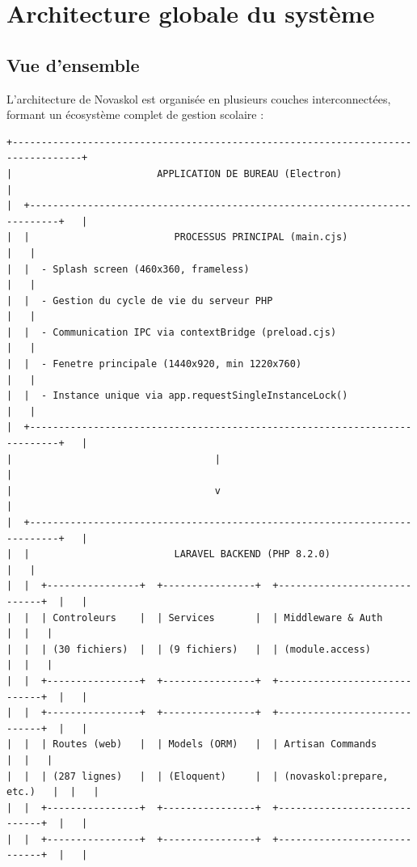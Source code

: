 \documentclass[12pt,a4paper,twoside]{report}
\begin{document}
\section{Architecture globale du système}

\subsection{Vue d'ensemble}

L'architecture de Novaskol est organisée en plusieurs couches interconnectées, formant un écosystème complet de gestion scolaire :

\begin{verbatim}
+----------------------------------------------------------------------------------+
|                         APPLICATION DE BUREAU (Electron)                          |
|  +---------------------------------------------------------------------------+   |
|  |                         PROCESSUS PRINCIPAL (main.cjs)                    |   |
|  |  - Splash screen (460x360, frameless)                                     |   |
|  |  - Gestion du cycle de vie du serveur PHP                                 |   |
|  |  - Communication IPC via contextBridge (preload.cjs)                      |   |
|  |  - Fenetre principale (1440x920, min 1220x760)                            |   |
|  |  - Instance unique via app.requestSingleInstanceLock()                    |   |
|  +---------------------------------------------------------------------------+   |
|                                   |                                                |
|                                   v                                                |
|  +---------------------------------------------------------------------------+   |
|  |                         LARAVEL BACKEND (PHP 8.2.0)                       |   |
|  |  +----------------+  +----------------+  +-----------------------------+  |   |
|  |  | Controleurs    |  | Services       |  | Middleware & Auth           |  |   |
|  |  | (30 fichiers)  |  | (9 fichiers)   |  | (module.access)            |  |   |
|  |  +----------------+  +----------------+  +-----------------------------+  |   |
|  |  +----------------+  +----------------+  +-----------------------------+  |   |
|  |  | Routes (web)   |  | Models (ORM)   |  | Artisan Commands            |  |   |
|  |  | (287 lignes)   |  | (Eloquent)     |  | (novaskol:prepare, etc.)   |  |   |
|  |  +----------------+  +----------------+  +-----------------------------+  |   |
|  |  +----------------+  +----------------+  +-----------------------------+  |   |

\end{verbatim}
\end{document}
